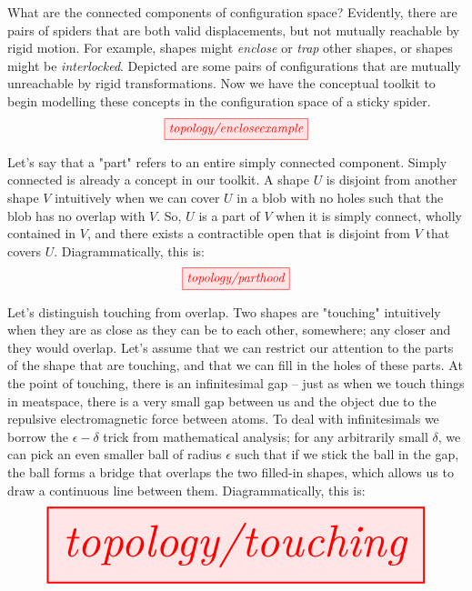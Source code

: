 \begin{myboxR}
\begin{example}
What are the connected components of configuration space? Evidently, there are pairs of spiders that are both valid displacements, but not mutually reachable by rigid motion. For example, shapes might \emph{enclose} or \emph{trap} other shapes, or shapes might be \emph{interlocked}. Depicted are some pairs of configurations that are mutually unreachable by rigid transformations. Now we have the conceptual toolkit to begin modelling these concepts in the configuration space of a sticky spider.
\[\tikzfig{topology/encloseexample}\]
\end{example}
\end{myboxR}


\begin{myboxB}
\begin{defn}[Parthood]\label{defn:parthood}
Let's say that a "part" refers to an entire simply connected component. Simply connected is already a concept in our toolkit. A shape $U$ is disjoint from another shape $V$ intuitively when we can cover $U$ in a blob with no holes such that the blob has no overlap with $V$. So, $U$ is a part of $V$ when it is simply connect, wholly contained in $V$, and there exists a contractible open that is disjoint from $V$ that covers $U$. Diagrammatically, this is:
\[\tikzfig{topology/parthood}\]
\end{defn}

\end{myboxB}

\begin{myboxR}
\begin{defn}[Touching]\label{defn:touching}
Let's distinguish touching from overlap. Two shapes are "touching" intuitively when they are as close as they can be to each other, somewhere; any closer and they would overlap. Let's assume that we can restrict our attention to the parts of the shape that are touching, and that we can fill in the holes of these parts. At the point of touching, there is an infinitesimal gap -- just as when we touch things in meatspace, there is a very small gap between us and the object due to the repulsive electromagnetic force between atoms. To deal with infinitesimals we borrow the $\epsilon-\delta$ trick from mathematical analysis; for any arbitrarily small $\delta$, we can pick an even smaller ball of radius $\epsilon$ such that if we stick the ball in the gap, the ball forms a bridge that overlaps the two filled-in shapes, which allows us to draw a continuous line between them. Diagrammatically, this is: 
\[\resizebox{\textwidth}{!}{\tikzfig{topology/touching}}\]
\end{defn}
\end{myboxR}

